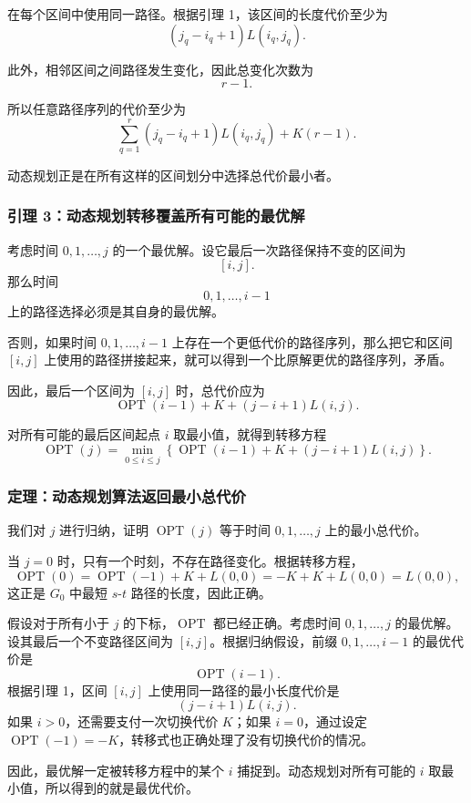 \documentclass[12pt,a4paper]{article}
\begin{document}
\begin{answerbox}
在每个区间中使用同一路径。根据引理 1，该区间的长度代价至少为
\[
(j_q-i_q+1)L(i_q,j_q).
\]

此外，相邻区间之间路径发生变化，因此总变化次数为
\[
r-1.
\]

所以任意路径序列的代价至少为
\[
\sum_{q=1}^{r}
(j_q-i_q+1)L(i_q,j_q)
+
K(r-1).
\]

动态规划正是在所有这样的区间划分中选择总代价最小者。

\subsubsection*{引理 3：动态规划转移覆盖所有可能的最优解}

考虑时间 $0,1,\ldots,j$ 的一个最优解。设它最后一次路径保持不变的区间为
\[
[i,j].
\]
那么时间
\[
0,1,\ldots,i-1
\]
上的路径选择必须是其自身的最优解。

否则，如果时间 $0,1,\ldots,i-1$ 上存在一个更低代价的路径序列，那么把它和区间 $[i,j]$ 上使用的路径拼接起来，就可以得到一个比原解更优的路径序列，矛盾。

因此，最后一个区间为 $[i,j]$ 时，总代价应为
\[
\operatorname{OPT}(i-1)
+
K
+
(j-i+1)L(i,j).
\]

对所有可能的最后区间起点 $i$ 取最小值，就得到转移方程
\[
\operatorname{OPT}(j)
=
\min_{0\le i\le j}
\left\{
\operatorname{OPT}(i-1)
+
K
+
(j-i+1)L(i,j)
\right\}.
\]

\subsubsection*{定理：动态规划算法返回最小总代价}

我们对 $j$ 进行归纳，证明 $\operatorname{OPT}(j)$ 等于时间 $0,1,\ldots,j$ 上的最小总代价。

当 $j=0$ 时，只有一个时刻，不存在路径变化。根据转移方程，
\[
\operatorname{OPT}(0)
=
\operatorname{OPT}(-1)+K+L(0,0)
=
-K+K+L(0,0)
=
L(0,0),
\]
这正是 $G_0$ 中最短 $s$-$t$ 路径的长度，因此正确。

假设对于所有小于 $j$ 的下标，$\operatorname{OPT}$ 都已经正确。考虑时间 $0,1,\ldots,j$ 的最优解。设其最后一个不变路径区间为 $[i,j]$。根据归纳假设，前缀 $0,1,\ldots,i-1$ 的最优代价是
\[
\operatorname{OPT}(i-1).
\]
根据引理 1，区间 $[i,j]$ 上使用同一路径的最小长度代价是
\[
(j-i+1)L(i,j).
\]
如果 $i>0$，还需要支付一次切换代价 $K$；如果 $i=0$，通过设定 $\operatorname{OPT}(-1)=-K$，转移式也正确处理了没有切换代价的情况。

因此，最优解一定被转移方程中的某个 $i$ 捕捉到。动态规划对所有可能的 $i$ 取最小值，所以得到的就是最优代价。


\end{answerbox}
\end{document}
